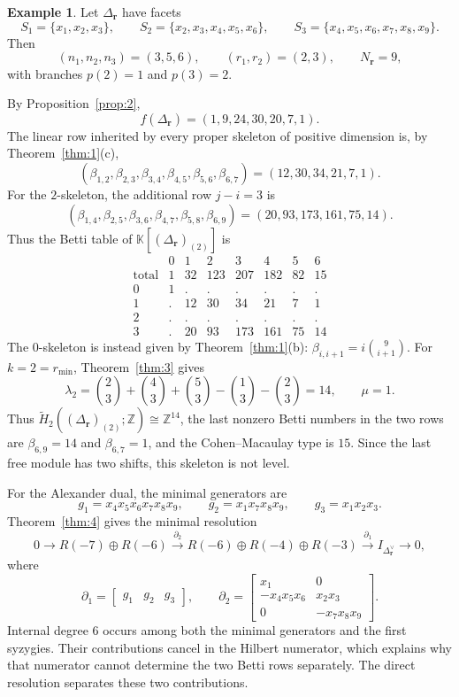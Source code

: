 \documentclass[11pt]{amsart}
\theoremstyle{definition}
\newtheorem{example}[theorem]{Example}
\theoremstyle{remark}
\newcommand{\K}{\mathbb K}
\newcommand{\SR}[1]{\K[#1]}
\begin{document}
	\begin{example}\label{ex:2}
		Let $\Delta_{\mathbf r}$ have facets
		\[
		S_1=\{x_1,x_2,x_3\},\qquad
		S_2=\{x_2,x_3,x_4,x_5,x_6\},\qquad
		S_3=\{x_4,x_5,x_6,x_7,x_8,x_9\}.
		\]
		Then
		\[
		(n_1,n_2,n_3)=(3,5,6),
		\qquad
		(r_1,r_2)=(2,3),
		\qquad
		N_{\mathbf r}=9,
		\]
		with branches $p(2)=1$ and $p(3)=2$.
		
		By Proposition~\ref{prop:2},
		\[
		f(\Delta_{\mathbf r})=(1,9,24,30,20,7,1).
		\]
		The linear row inherited by every proper skeleton of positive dimension is, by Theorem~\ref{thm:1}(c),
		\[
		(\beta_{1,2},\beta_{2,3},\beta_{3,4},\beta_{4,5},\beta_{5,6},\beta_{6,7})
		=(12,30,34,21,7,1).
		\]
		For the $2$-skeleton, the additional row $j-i=3$ is
		\[
		(\beta_{1,4},\beta_{2,5},\beta_{3,6},\beta_{4,7},\beta_{5,8},\beta_{6,9})
		=(20,93,173,161,75,14).
		\]
		Thus the Betti table of $\SR{(\Delta_{\mathbf r})_{(2)}}$ is
		\[
		\begin{array}{r|rrrrrrr}
			&0&1&2&3&4&5&6\\ \hline
			\mathrm{total}&1&32&123&207&182&82&15\\
			0&1&.&.&.&.&.&.\\
			1&.&12&30&34&21&7&1\\
			2&.&.&.&.&.&.&.\\
			3&.&20&93&173&161&75&14
		\end{array}
		\]
		The $0$-skeleton is instead given by Theorem~\ref{thm:1}(b): $\beta_{i,i+1}=i\binom9{i+1}$. For $k=2=r_{\min}$, Theorem~\ref{thm:3} gives
		\[
		\lambda_2=
		\binom23+\binom43+\binom53
		-\binom13-\binom23=14,
		\qquad
		\mu=1.
		\]
		Thus $\widetilde H_2((\Delta_{\mathbf r})_{(2)};\mathbb Z)\cong\mathbb Z^{14}$, the last nonzero Betti numbers in the two rows are $\beta_{6,9}=14$ and $\beta_{6,7}=1$, and the Cohen--Macaulay type is $15$. Since the last free module has two shifts, this skeleton is not level.
		
		For the Alexander dual, the minimal generators are
		\[
		g_1=x_4x_5x_6x_7x_8x_9,
		\qquad
		g_2=x_1x_7x_8x_9,
		\qquad
		g_3=x_1x_2x_3.
		\]
		Theorem~\ref{thm:4} gives the minimal resolution
		\[
		0\longrightarrow R(-7)\oplus R(-6)
		\xrightarrow{\partial_2}
		R(-6)\oplus R(-4)\oplus R(-3)
		\xrightarrow{\partial_1}
		I_{\Delta_{\mathbf r}^\vee}
		\longrightarrow0,
		\]
		where
		\[
		\partial_1=\begin{bmatrix}g_1&g_2&g_3\end{bmatrix},
		\qquad
		\partial_2=
		\begin{bmatrix}
			x_1&0\\
			-x_4x_5x_6&x_2x_3\\
			0&-x_7x_8x_9
		\end{bmatrix}.
		\]
		Internal degree $6$ occurs among both the minimal generators and the first syzygies. Their contributions cancel in the Hilbert numerator, which explains why that numerator cannot determine the two Betti rows separately. The direct resolution separates these two contributions.
		

\end{example}
\end{document}
